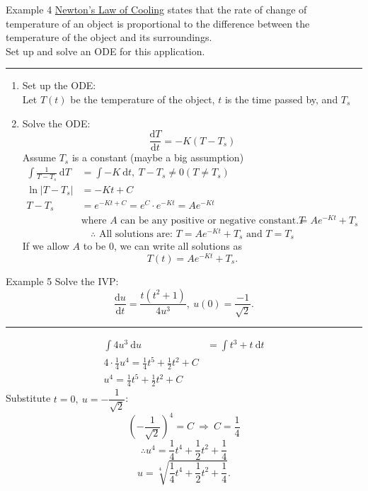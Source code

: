 \documentclass[12pt,a4paper]{article}
\def\d{{\mathrm{d}}}
\begin{document}
\begin{eg}{Example 4}
	\underline{Newton's Law of Cooling} states that the rate of change of temperature of an object is proportional to the difference between the temperature of the object and its surroundings. \\
	Set up and solve an ODE for this application. \\
	\noindent\rule[0.25\baselineskip]{\textwidth}{1pt}
	\begin{enumerate}
		\item Set up the ODE: \\
		Let $T(t)$ be the temperature of the object, $t$ is the time passed by, and $T_s$
		\item Solve the ODE: 
		$$\frac{\d T}{\d t}=-K(T-T_s)$$
		Assume $T_s$ is a constant (maybe a big assumption)
		$$\begin{aligned}
			\int\frac{1}{T-T_s}\ \d T&=\int-K\ \d t,\ T-T_s\neq 0(T\neq T_s)\\
			\ln|T-T_s|&=-Kt+C\\
			T-T_s&=e^{-Kt+C}=e^C\cdot e^{-Kt}=Ae^{-Kt}\\
			&\text{where }A\text{ can be any positive or negative constant.}
			T&=Ae^{-Kt}+T_s
		\end{aligned}$$
		$$\therefore \text{ All solutions are: }T=Ae^{-Kt}+T_s\text{ and }T=T_s$$
		If we allow $A$ to be $0$, we can write all solutions as $$T(t)=Ae^{-Kt}+T_s.$$
	\end{enumerate}
\end{eg}
\begin{eg}{Example 5}
	Solve the IVP: $$\frac{\d u}{\d t}=\frac{t(t^2+1)}{4u^3},\ u(0)=\frac{-1}{\sqrt{2}}.$$
	\noindent\rule[0.25\baselineskip]{\textwidth}{1pt}
	$$\begin{aligned}
		\int 4u^3\ \d u&=\int t^3+t\ \d t\\
		4\cdot\frac{1}{4}u^4=\frac{1}{4}t^5+\frac{1}{2}t^2+C\\
		u^4=\frac{1}{4}t^5+\frac{1}{2}t^2+C
	\end{aligned}$$
	Substitute $t=0,\ u=-\dfrac{1}{\sqrt{2}}$: 
	$$\left(-\dfrac{1}{\sqrt{2}}\right)^4=C\ \Rightarrow\ C=\frac{1}{4}$$
	$$\therefore u^4=\frac{1}{4}t^4+\frac{1}{2}t^2+\frac{1}{4}$$
	$$u=\sqrt[4]{\frac{1}{4}t^4+\frac{1}{2}t^2+\frac{1}{4}}.$$
\end{eg}
\end{document}
